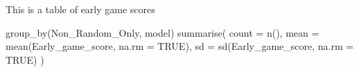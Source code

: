 \documentclass{article}
\begin{document}


This is a table of early game scores 

group_by(Non_Random_Only, model) %
  summarise(
    count = n(),
    mean = mean(Early_game_score, na.rm = TRUE),
    sd = sd(Early_game_score, na.rm = TRUE)
  )
\end{document}
